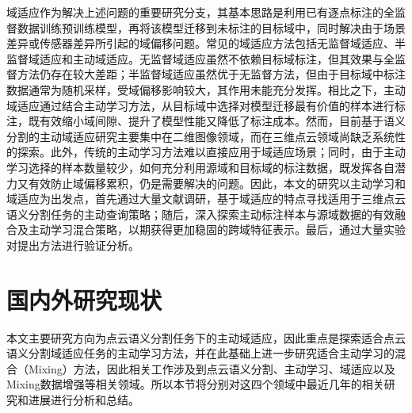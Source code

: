     域适应作为解决上述问题的重要研究分支，其基本思路是利用已有逐点标注的全监督数据训练预训练模型，再将该模型迁移到未标注的目标域中，同时解决由于场景差异或传感器差异所引起的域偏移问题。常见的域适应方法包括无监督域适应、半监督域适应和主动域适应。无监督域适应虽然不依赖目标域标注，但其效果与全监督方法仍存在较大差距；半监督域适应虽然优于无监督方法，但由于目标域中标注数据通常为随机采样，受域偏移影响较大，其作用未能充分发挥。相比之下，主动域适应通过结合主动学习方法，从目标域中选择对模型迁移最有价值的样本进行标注，既有效缩小域间隙、提升了模型性能又降低了标注成本。然而，目前基于语义分割的主动域适应研究主要集中在二维图像领域，而在三维点云领域尚缺乏系统性的探索。此外，传统的主动学习方法难以直接应用于域适应场景；同时，由于主动学习选择的样本数量较少，如何充分利用源域和目标域的标注数据，既发挥各自潜力又有效防止域偏移累积，仍是需要解决的问题。因此，本文的研究以主动学习和域适应为出发点，首先通过大量文献调研，基于域适应的特点寻找适用于三维点云语义分割任务的主动查询策略；随后，深入探索主动标注样本与源域数据的有效融合及主动学习混合策略，以期获得更加稳固的跨域特征表示。最后，通过大量实验对提出方法进行验证分析。

\section{国内外研究现状}
本文主要研究方向为点云语义分割任务下的主动域适应，因此重点是探索适合点云语义分割域适应任务的主动学习方法，并在此基础上进一步研究适合主动学习的混合（Mixing）方法，因此相关工作涉及到点云语义分割、主动学习、域适应以及Mixing数据增强等相关领域。所以本节将分别对这四个领域中最近几年的相关研究和进展进行分析和总结。

